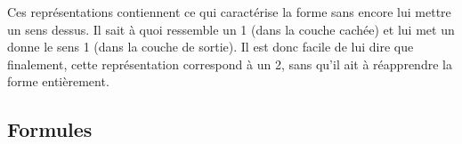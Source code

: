   Ces représentations contiennent ce qui caractérise la forme sans encore lui mettre un sens dessus.
  Il sait à quoi ressemble un 1 (dans la couche cachée) et lui met un donne le sens 1 (dans la couche de sortie).
  Il est donc facile de lui dire que finalement, cette représentation correspond à un 2, sans qu'il ait à réapprendre
  la forme entièrement.
  
  

  \newpage 
  \subsection{Formules}
    
    



